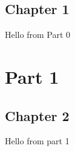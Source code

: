 \documentclass{report}
\begin{document}
\chapter{Chapter 1}
Hello from Part 0

\part{Part 1}

\chapter{Chapter 2}
Hello from part 1
\end{document}
